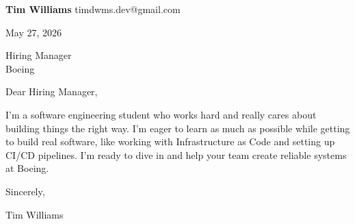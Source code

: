 \documentclass[12pt]{article}
\begin{document}
\textbf{Tim Williams} \hfill timdwms.dev@gmail.com

\vspace{1em}

May 27, 2026

\vspace{1em}

Hiring Manager \\
Boeing

\vspace{1em}

Dear Hiring Manager,

I'm a software engineering student who works hard and really cares about building things the right way. I'm eager to learn as much as possible while getting to build real software, like working with Infrastructure as Code and setting up CI/CD pipelines. I'm ready to dive in and help your team create reliable systems at Boeing.

\vspace{1em}

Sincerely,

\vspace{2em}

Tim Williams
\end{document}
